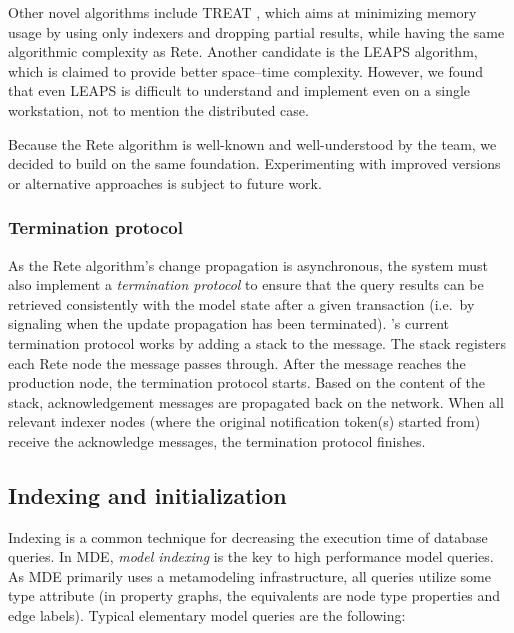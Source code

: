 Other novel algorithms include TREAT \cite{Miranker:1991:OPT:627280.627434}, which aims at minimizing memory usage by using only indexers and dropping partial results, while having the same algorithmic complexity as Rete. Another candidate is the LEAPS \cite{Batory:1994:LA:899216} algorithm, which is claimed to provide better space--time complexity. However, we found that even LEAPS is difficult to understand and implement even on a single workstation, not to mention the distributed case. 

Because the Rete algorithm is well-known and well-understood by the \eiq{} team, we decided to build \iqd{} on the same foundation. Experimenting with improved versions or alternative approaches is subject to future work.

\subsubsection{Termination protocol}

As the Rete algorithm's change propagation is asynchronous, the system must also implement a \emph{termination protocol} to ensure that the query results can be retrieved consistently with the model state after a given transaction (i.e.\ by signaling when the update propagation has been terminated). \iqd{}'s current termination protocol works by adding a stack to the message. The stack registers each Rete node the message passes through. After the message reaches the production node, the termination protocol starts. Based on the content of the stack, acknowledgement messages are propagated back on the network. When all relevant indexer nodes (where the original notification token(s) started from) receive the acknowledge messages, the termination protocol finishes.


\subsection{Indexing and initialization}
\label{indexing}

Indexing is a common technique for decreasing the execution time of database queries. In MDE, \emph{model indexing} is the key to high performance model queries. As MDE primarily uses a metamodeling infrastructure, all queries utilize some type attribute (in property graphs, the equivalents are node type properties and edge labels). Typical elementary model queries are the following:

